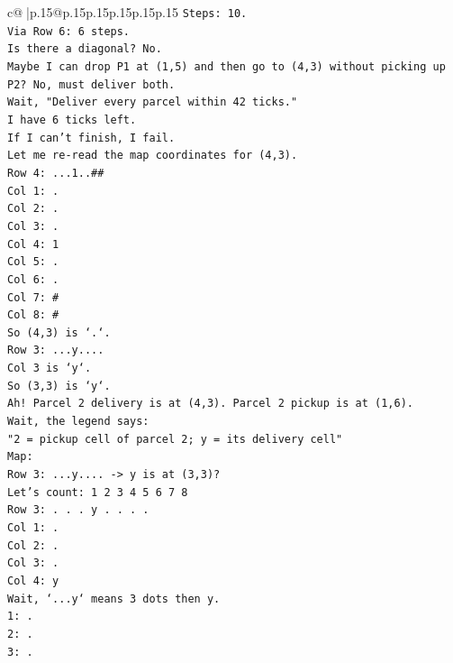 \documentclass{article}
\begin{document}
{\begin{supertabular}{c@{$\;$}|p{.15\linewidth}@{}p{.15\linewidth}p{.15\linewidth}p{.15\linewidth}p{.15\linewidth}p{.15\linewidth}}
{{{\texttt{Steps: 10.} \\
\texttt{Via Row 6: 6 steps.} \\
\texttt{Is there a diagonal? No.} \\
\texttt{Maybe I can drop P1 at (1,5) and then go to (4,3) without picking up P2? No, must deliver both.} \\
\texttt{Wait, "Deliver every parcel within 42 ticks."} \\
\texttt{I have 6 ticks left.} \\
\texttt{If I can't finish, I fail.} \\
\texttt{Let me re{-}read the map coordinates for (4,3).} \\
\texttt{Row 4: ...1..\#\#} \\
\texttt{Col 1: .} \\
\texttt{Col 2: .} \\
\texttt{Col 3: .} \\
\texttt{Col 4: 1} \\
\texttt{Col 5: .} \\
\texttt{Col 6: .} \\
\texttt{Col 7: \#} \\
\texttt{Col 8: \#} \\
\texttt{So (4,3) is `.`.} \\
\texttt{Row 3: ...y....} \\
\texttt{Col 3 is `y`.} \\
\texttt{So (3,3) is `y`.} \\
\texttt{Ah! Parcel 2 delivery is at (4,3). Parcel 2 pickup is at (1,6).} \\
\texttt{Wait, the legend says:} \\
\texttt{"2 = pickup cell of parcel 2; y = its delivery cell"} \\
\texttt{Map:} \\
\texttt{Row 3: ...y.... {-}> y is at (3,3)?} \\
\texttt{Let's count: 1 2 3 4 5 6 7 8} \\
\texttt{Row 3: . . . y . . . .} \\
\texttt{Col 1: .} \\
\texttt{Col 2: .} \\
\texttt{Col 3: .} \\
\texttt{Col 4: y} \\
\texttt{Wait, `...y` means 3 dots then y.} \\
\texttt{1: .} \\
\texttt{2: .} \\
\texttt{3: .} \\
}}}
\end{supertabular}}
\end{document}
